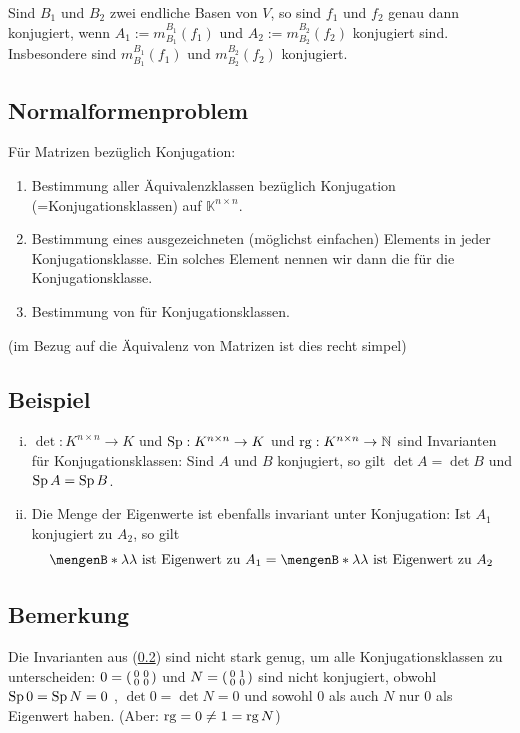 Sind $B_1$ und $B_2$ zwei endliche Basen von $V$, so sind $f_1$ und $f_2$ genau dann konjugiert, wenn $A_1 := m_{B_1}^{B_1} (f_1)$ und $A_2 := m_{B_2}^{B_2}(f_2)$
konjugiert sind. Insbesondere sind $m_{B_1}^{B_1} (f_1)$ und $ m_{B_2}^{B_2}(f_2)$ konjugiert.

\subsection{Normalformenproblem} %
\label{sub:52}
Für Matrizen bezüglich Konjugation:
\begin{enumerate}[(1)]
	\item Bestimmung aller Äquivalenzklassen bezüglich Konjugation (=Konjugationsklassen) auf $\mathds{K}^{n \times n}$.
	\item Bestimmung eines ausgezeichneten (möglichst einfachen) Elements in jeder Konjugationsklasse. Ein solches Element nennen wir
	dann die  für die Konjugationsklasse. 
	\item Bestimmung von  für Konjugationsklassen.
\end{enumerate}
(im Bezug auf die Äquivalenz von Matrizen ist dies recht simpel)

\subsection[Beispiele zu Invarianten]{Beispiel} %
\label{sub:53}
\begin{enumerate}[i)]
	\item $\det : K^{n \times n} \to K$ und $\Sp : K^{n \times n} \to K$ und $\rg : K^{n \times n} \to \mathds{N}$ sind Invarianten für 
	Konjugationsklassen: Sind $A$ und $B$ konjugiert, so gilt $\det A = \det B$ und $\Sp A = \Sp B$.  
	\item Die Menge der Eigenwerte ist ebenfalls invariant unter Konjugation: Ist $A_1$ konjugiert zu $A_2$, so gilt 
	\[
		\set[\lambda ]{\lambda  \text{ ist Eigenwert zu }A_1} = \set[\lambda ]{\lambda  \text{ ist Eigenwert zu }A_2} 
	\]
\end{enumerate}

\subsection[Bemerkung, dass Invarianten nicht reichen zur Unterscheidung der Konjugationsklassen]{Bemerkung} %
\label{sub:54}
Die Invarianten aus (\ref{sub:53}) sind nicht stark genug, um alle Konjugationsklassen zu unterscheiden: $0 = \enbrace*{\begin{smallmatrix}0 & 0 \\ 0 &0 \end{smallmatrix}}$
und $N = \enbrace*{\begin{smallmatrix}0 & 1 \\ 0 &0 \end{smallmatrix}}$ sind nicht konjugiert, obwohl $\Sp 0 = \Sp N = 0$ , $\det 0 = \det N = 0$ und sowohl 0 als auch $N$ 
nur 0 als Eigenwert haben. (Aber: $\rg = 0 \not= 1 = \rg N$)

